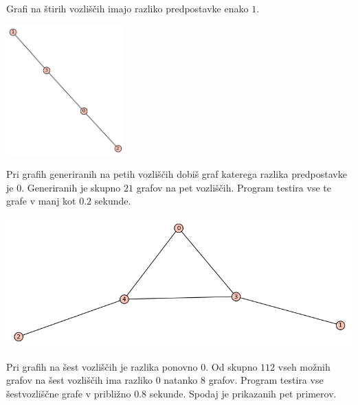 \documentclass[10pt, a4paper]{article}
\begin{document}
Grafi na štirih vozliščih imajo razliko predpostavke enako $1$.

\begin{center}
\includegraphics[height=5cm]{min_graf_4}
\end{center}

Pri grafih generiranih na petih vozliščih dobiš graf katerega razlika predpostavke je $0$. Generiranih je skupno $21$ grafov na pet vozliščih. Program testira vse te grafe v manj kot $0.2$ sekunde.

\begin{center}
\includegraphics[height=5cm]{min_graf_5}
\end{center}

Pri grafih na šest vozliščih je razlika ponovno $0$. Od skupno $112$ vseh možnih grafov na šest vozliščih ima razliko $0$ natanko $8$ grafov. Program testira vse šestvozliščne grafe v približno $0.8$ sekunde. Spodaj je prikazanih pet primerov.
\end{document}
